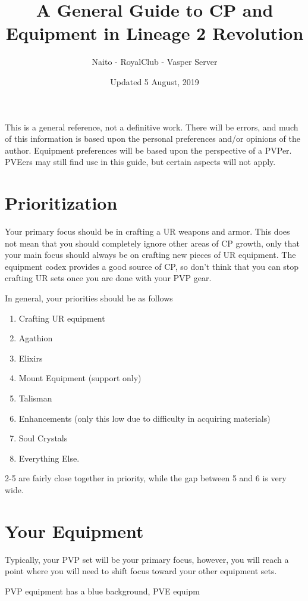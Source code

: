 \documentclass[]{article}
\title{A General Guide to CP and Equipment in Lineage 2 Revolution}
\author{Naito - RoyalClub - Vasper Server}
\date{Updated 5 August, 2019}
\begin{document}
\maketitle

This is a general reference, not a definitive work.
There will be errors, and much of this information is based upon the personal preferences and/or opinions of the author.
Equipment preferences will be based upon the perspective of a PVPer.
PVEers may still find use in this guide, but certain aspects will not apply.

\tableofcontents

\pagebreak
\section{Prioritization}

Your primary focus should be in crafting a UR weapons and armor.
This does not mean that you should completely ignore other areas of CP growth, only that your main focus should always be on crafting new pieces of UR equipment.
The equipment codex provides a good source of CP, so don't think that you can stop crafting UR sets once you are done with your PVP gear.

In general, your priorities should be as follows
\begin{enumerate}
	\item Crafting UR equipment
	\item Agathion
	\item Elixirs
	\item Mount Equipment (support only)
	\item Talisman
	\item Enhancements (only this low due to difficulty in acquiring materials)
	\item Soul Crystals 
	\item Everything Else.
\end{enumerate}

2-5 are fairly close together in priority, while the gap between 5 and 6 is very wide.
\section{Your Equipment}

Typically, your PVP set will be your primary focus, however, you will reach a point where you will need to shift focus toward your other equipment sets.

PVP equipment has a blue background, PVE equipm
\end{document}
